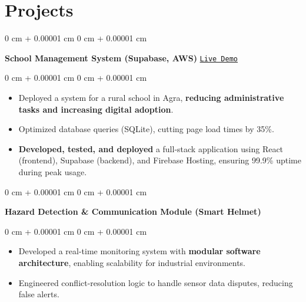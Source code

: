 \documentclass[10pt, letterpaper]{article}
\newenvironment{highlights}{ \begin{itemize}[ topsep=0.10 cm, parsep=0.10 cm, partopsep=0pt,
itemsep=0pt, leftmargin=0 cm + 10pt ] }{ \end{itemize} } %
\newenvironment{onecolentry}{ \begin{adjustwidth}{ 0 cm + 0.00001 cm }{ 0 cm + 0.00001 cm }
}{ \end{adjustwidth} } %
\begin{document}
	\section{Projects}

\begin{onecolentry}
    \textbf{School Management System (Supabase, AWS)} \hfill \href{https://stgdconventschool.com}{\texttt{Live Demo}}
\end{onecolentry}

\begin{onecolentry}
    \begin{highlights}
        \vspace{0.1cm}
        \item Deployed a system for a rural school in Agra, \textbf{reducing administrative tasks and increasing digital adoption}. \\
        \item Optimized database queries (SQLite), cutting page load times by 35\%. \\
        \item \textbf{Developed, tested, and deployed} a full-stack application using React (frontend), Supabase (backend), and Firebase Hosting, ensuring 99.9\% uptime during peak usage. 
    \end{highlights}
\end{onecolentry}




\vspace{0.10 cm}
\begin{onecolentry}
    \textbf{Hazard Detection \& Communication Module (Smart Helmet)
} 
\end{onecolentry}
\begin{onecolentry}
    \begin{highlights}
    \vspace{0.10 cm}
        \item Developed a real-time monitoring system with \textbf{modular software architecture}, enabling scalability for industrial environments. \\
        \item Engineered conflict-resolution logic to handle sensor data disputes, reducing false alerts.  
    \end{highlights}
\end{onecolentry}
\end{document}
